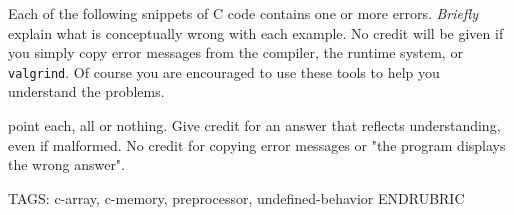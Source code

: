 \clearpage
{}

Each of the following snippets of C code contains one or more
errors. \emph{Briefly} explain what is conceptually wrong with each
example. No credit will be given if you simply copy error messages
from the compiler, the runtime system, or \lstinline'valgrind'. Of
course you are encouraged to use these tools to help you understand
the problems.

 point each, all or nothing. Give credit for an answer that reflects
understanding, even if malformed. No credit for copying error messages
or "the program displays the wrong answer".

TAGS: c-array, c-memory, preprocessor, undefined-behavior
ENDRUBRIC

\begin{parts}
\newcommand{\ans}[2][1in]{%
  \ifprintanswers{%
  \parbox{0.99\linewidth}{\color{\answerColor}#2}}
  \else~\vspace{#1}\fi%
}





\newpage

\newpage


\end{parts}
